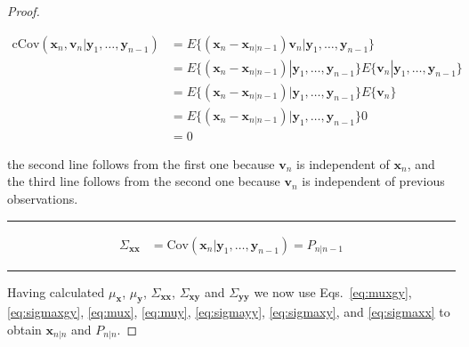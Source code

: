 \documentclass[12pt]{article}
\begin{document}
\begin{proof}
\begin{itemize}
            \begin{align*}
                \text{cCov}(\mathbf{x}_n,\mathbf{v}_n|\mathbf{y}_1,\ldots,\mathbf{y}_{n-1})&=E\{(\mathbf{x}_n-\mathbf{x}_{n|n-1})\mathbf{v}_n|\mathbf{y}_1,\ldots,\mathbf{y}_{n-1}\}\\
                                                                                           &=E\{(\mathbf{x}_n-\mathbf{x}_{n|n-1})|\mathbf{y}_1,\ldots,\mathbf{y}_{n-1}\}E\{\mathbf{v}_n|\mathbf{y}_1,\ldots,\mathbf{y}_{n-1}\}\\
                                                                                           &=E\{(\mathbf{x}_n-\mathbf{x}_{n|n-1})|\mathbf{y}_1,\ldots,\mathbf{y}_{n-1}\}E\{\mathbf{v}_n\}\\
                                                                                           &=E\{(\mathbf{x}_n-\mathbf{x}_{n|n-1})|\mathbf{y}_1,\ldots,\mathbf{y}_{n-1}\}0\\
                                                                                           &=0
            \end{align*}

            the second line follows from the first one because $\mathbf{v}_n$
            is independent of $\mathbf{x}_n$, and the third line follows from
            the second one because $\mathbf{v}_n$ is independent of previous
            observations.

    \end{itemize}
    \rule{2in}{0.4pt}

    \begin{align}
        \Sigma_{\mathbf{x}\mathbf{x}}&=\text{Cov}(\mathbf{x}_n|\mathbf{y}_1,\ldots,\mathbf{y}_{n-1})=P_{n|n-1}\label{eq:sigmaxx}
    \end{align}

    \rule{2in}{0.4pt}

    Having calculated $\mu_{\mathbf{x}}$, $\mu_{\mathbf{y}}$,
    $\Sigma_{\mathbf{x}\mathbf{x}}$, $\Sigma_{\mathbf{x}\mathbf{y}}$ and
    $\Sigma_{\mathbf{y}\mathbf{y}}$ we now use Eqs.~\ref{eq:muxgy},
    \ref{eq:sigmaxgy}, \ref{eq:mux},  \ref{eq:muy},  \ref{eq:sigmayy},
    \ref{eq:sigmaxy}, and \ref{eq:sigmaxx} to  
    obtain $\mathbf{x}_{n|n}$ and $P_{n|n}$.


\end{proof}
\end{document}
